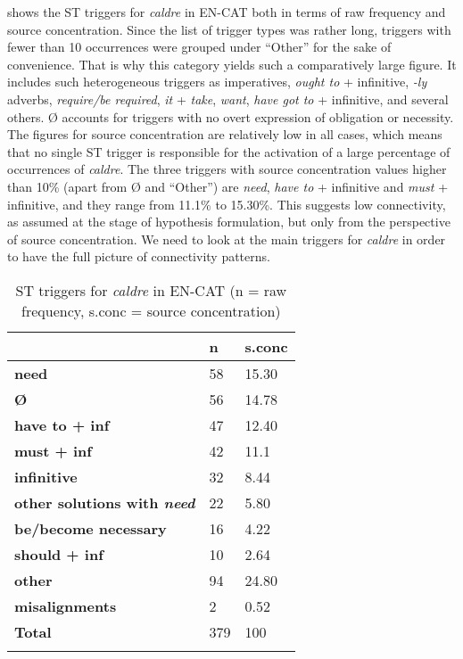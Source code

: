 \documentclass[output=paper,english,spanish,german,english]{langsci/langscibook}
\begin{document}
\largerpage
{} shows the ST triggers for \textit{caldre} in EN-CAT both in terms of raw frequency and source concentration. Since the list of trigger types was rather long, triggers with fewer than 10 occurrences were grouped under \enquote{Other} for the sake of convenience. That is why this category yields such a comparatively large figure. It includes such heterogeneous triggers as imperatives, \textit{ought to} + infinitive, \textit{-ly} adverbs, \textit{require/be required}, \textit{it} + \textit{take}, \textit{want}, \textit{have got to} + infinitive, and several others. Ø accounts for triggers with no overt expression of obligation or necessity. The figures for source concentration are relatively low in all cases, which means that no single ST trigger is responsible for the activation of a large percentage of occurrences of \textit{caldre}. The three triggers with source concentration values higher than 10\% (apart from Ø and \enquote{Other}) are \textit{need}, \textit{have to} + infinitive and \textit{must} + infinitive, and they range from 11.1\% to 15.30\%. This suggests low connectivity, as assumed at the stage of hypothesis formulation, but only from the perspective of source concentration. We need to look at the main triggers for \textit{caldre} in order to have the full picture of connectivity patterns.

\begin{table}[t]
\caption{ST triggers for \textit{caldre} in EN-CAT (n = raw frequency, s.conc = source concentration)}\label{triggers}
  \begin{tabularx}{\textwidth}{lYY}
    \lsptoprule
    & {\bfseries n} & {\bfseries s.conc}\\
    \midrule
    {\bfseries need}                                & 58  & 15.30\\
    {\bfseries Ø}                                   & 56  & 14.78\\
    {\bfseries have to + inf}                       & 47  & 12.40\\
    {\bfseries must + inf}                          & 42  & 11.1\\
    {\bfseries infinitive}                          & 32  & 8.44\\
    {\bfseries other solutions with \textit{need}}  & 22  & 5.80\\
    {\bfseries be/become necessary}                 & 16  & 4.22\\
    {\bfseries should + inf}                        & 10  & 2.64\\
    {\bfseries other}                               & 94  & 24.80\\
    {\bfseries misalignments}                       & 2   & 0.52\\
    \midrule
    {\bfseries Total}                               & 379 & 100\\
    \lspbottomrule
  \end{tabularx}
\end{table}
\end{document}
